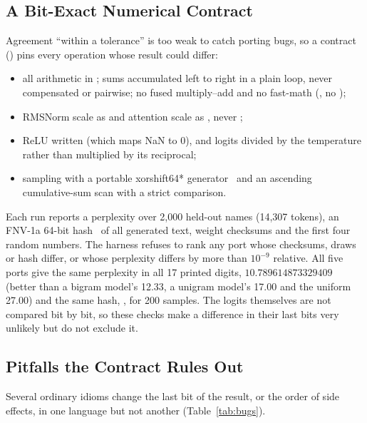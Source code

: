 \subsection{A Bit-Exact Numerical Contract}
\label{sec:contract}

Agreement ``within a tolerance'' is too weak to catch porting bugs, so a
contract () pins every operation whose result could differ:

\begin{itemize}
  \item all arithmetic in ; sums accumulated left to right in a plain
        loop, never compensated or pairwise; no fused multiply--add and no
        fast-math (, no );
  \item RMSNorm scale as  and attention scale as
        , never ;
  \item ReLU written  (which maps NaN to 0), and logits
        divided by the temperature rather than multiplied by its reciprocal;
  \item sampling with a portable xorshift64*
        generator~\cite{marsaglia2003xorshift,vigna2016xorshift} and an ascending
        cumulative-sum scan with a strict \code{<} comparison.
\end{itemize}

Each run reports a perplexity over 2,000 held-out names (14,307 tokens), an
FNV-1a 64-bit hash~\cite{fnv} of all generated text, weight checksums and the
first four random numbers. The harness refuses to rank any port whose
checksums, draws or hash differ, or whose perplexity differs by more than
$10^{-9}$ relative. All five ports give the same perplexity in all 17
printed digits, $10.789614873329409$ (better than a bigram model's 12.33, a unigram model's
17.00 and the uniform 27.00) and the same hash, , for 200
samples. The logits themselves are not compared bit by bit, so these checks
make a difference in their last bits very unlikely but do not exclude it.

\subsection{Pitfalls the Contract Rules Out}
\label{sec:traps}

Several ordinary idioms change the last bit of the result, or the order of
side effects, in one language but not another (Table~\ref{tab:bugs}).

